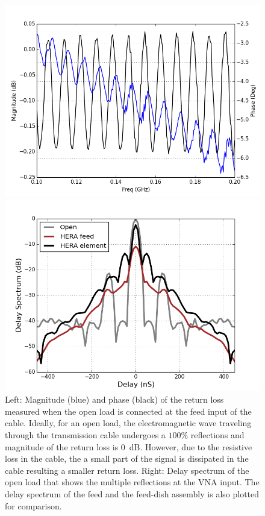 \documentclass[twocolumn]{emulateapj}
\begin{document}
    \begin{figure}[ht]
    \begin{minipage}[b]{0.5\linewidth}
    \centering
    \includegraphics[angle=0, width=\linewidth]{plots/open_RL.png}
    \end{minipage}
    \hspace{0.1cm}
    \begin{minipage}[b]{0.5\linewidth}
    \centering
    \includegraphics[angle=0, width=\linewidth]{GB_reflectometry_part3/plot/open_delay.png}
    \end{minipage}
    \caption{Left: Magnitude (blue) and phase (black) of the return loss measured when the open load is connected at the feed input of the cable. Ideally, for an open load, the electromagnetic wave traveling through the transmission cable undergoes a $100\%$ reflections and magnitude of the return loss is 0~dB. However, due to the resistive loss in the cable, the a small part of the signal is dissipated in the cable resulting a smaller return loss.  Right: Delay spectrum of the open load that shows the multiple reflections at the VNA input. The delay spectrum of the feed and the feed-dish assembly is also plotted for comparison.}
    \label{fig:open_RL}       
    \end{figure}
    
\end{document}
